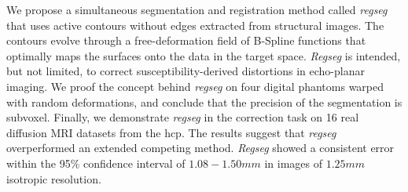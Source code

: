 We propose a simultaneous segmentation and registration method called \emph{regseg}
  that uses active contours without edges extracted from structural images.
The contours evolve through a free-deformation field of B-Spline functions that
  optimally maps the surfaces onto the data in the target space.
\emph{Regseg} is intended, but not limited, to correct susceptibility-derived distortions
  in echo-planar imaging.
We proof the concept behind \emph{regseg} on four digital phantoms warped with random
  deformations, and conclude that the precision of the segmentation is subvoxel.
Finally, we demonstrate \emph{regseg} in the correction task on 16 real diffusion MRI
  datasets from the \acrlong*{hcp}.
The results suggest that \emph{regseg} overperformed an extended competing method.
\emph{Regseg} showed a consistent error within the 95\% confidence interval of
  $1.08 - 1.50mm$ in images of $1.25mm$ isotropic resolution.

